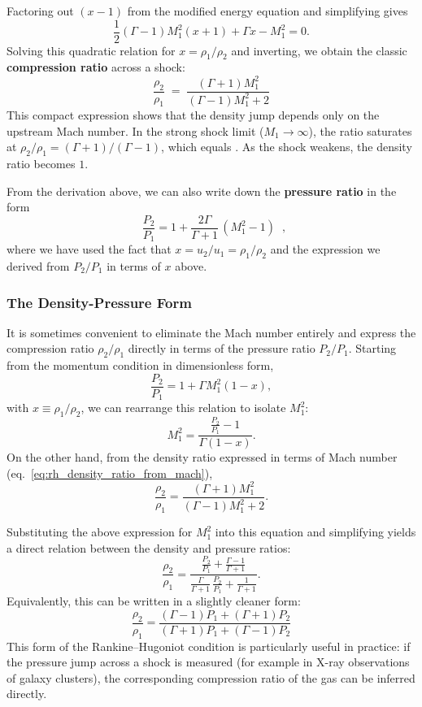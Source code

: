 Factoring out $(x-1)$ from the modified energy equation and simplifying gives
\[
\frac{1}{2}(\Gamma -1) M_1^2 (x+1) + \Gamma x - M_1^2 = 0.
\]
Solving this quadratic relation for $x = \rho_1/\rho_2$ and inverting, we obtain the 
classic \textbf{compression ratio} across a shock:
\begin{equation}
\label{eq:rh_density_ratio_from_mach}
\boxed{\;\;\frac{\rho_2}{\rho_1} \;=\; \frac{(\Gamma+1)M_1^2}{(\Gamma-1)M_1^2 + 2}\;\;}
\end{equation}
\noindent
This compact expression shows that the density jump depends only on the upstream Mach number.  
In the strong shock limit ($M_1 \to \infty$), the ratio saturates at
$\rho_2/\rho_1 = (\Gamma+1)/(\Gamma-1)$, which equals . As the shock weakens, the density ratio becomes $1$.
\par
From the derivation above, we can also write down the \textbf{pressure ratio} in the form
\begin{equation}
\boxed{\;\;\frac{P_2}{P_1} = 1 + \frac{2\Gamma}{\Gamma+1}\,(M_1^2 - 1)\;\;},
\end{equation}
where we have used the fact that $x = u_2/u_1 = \rho_1/\rho_2$ and the expression we derived from $P_2/P_1$ in terms of $x$ above.
\par

\subsubsection*{The Density-Pressure Form}
It is sometimes convenient to eliminate the Mach number entirely and express
the compression ratio $\rho_2/\rho_1$ directly in terms of the pressure ratio
$P_2/P_1$. Starting from the momentum condition in dimensionless form,
\[
\frac{P_2}{P_1} = 1 + \Gamma M_1^2 (1 - x),
\]
with $x \equiv \rho_1/\rho_2$, we can rearrange this relation to isolate $M_1^2$:
\[
M_1^2 = \frac{ \tfrac{P_2}{P_1} - 1 }{ \Gamma(1 - x) }.
\]
On the other hand, from the density ratio expressed in terms of Mach number
(eq.~\ref{eq:rh_density_ratio_from_mach}),
\[
\frac{\rho_2}{\rho_1} = \frac{(\Gamma+1) M_1^2}{(\Gamma-1)M_1^2 + 2}.
\]

Substituting the above expression for $M_1^2$ into this equation and simplifying
yields a direct relation between the density and pressure ratios:
\[
\frac{\rho_2}{\rho_1} =
\frac{ \tfrac{P_2}{P_1} + \tfrac{\Gamma -1}{\Gamma +1} }
     { \tfrac{\Gamma}{\Gamma +1}\,\tfrac{P_2}{P_1} + \tfrac{1}{\Gamma +1} } .
\]
Equivalently, this can be written in a slightly cleaner form:
\begin{equation}
\boxed{\;\;
\frac{\rho_2}{\rho_1}
= \frac{ (\Gamma - 1)P_1 + (\Gamma + 1)P_2 }
       { (\Gamma + 1)P_1 + (\Gamma - 1)P_2}
\;\;}
\end{equation}
\noindent
This form of the Rankine--Hugoniot condition is particularly useful in practice:
if the pressure jump across a shock is measured (for example in X-ray
observations of galaxy clusters), the corresponding compression ratio of the
gas can be inferred directly.

